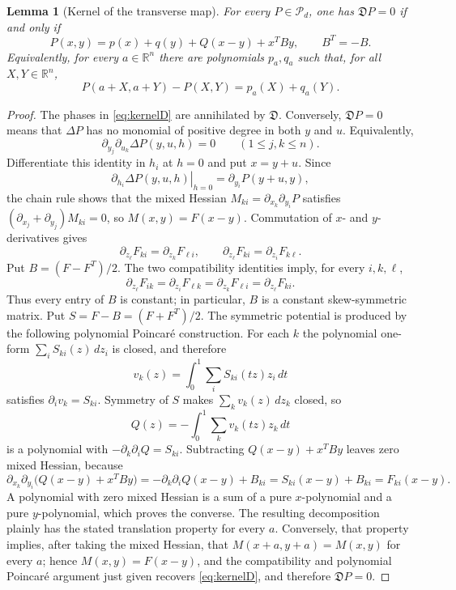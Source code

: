 \documentclass[11pt]{article}
\numberwithin{equation}{section}
\newtheorem{lemma}[theorem]{Lemma}
\theoremstyle{remark}
\theoremstyle{definition}
\newcommand{\R}{\mathbb R}
\newcommand{\Dop}{\mathfrak D}
\begin{document}
\begin{lemma}[Kernel of the transverse map]\label{lem:kernelD}
For every $P\in\mathcal P_d$, one has $\Dop P=0$ if and only if
\begin{equation}\label{eq:kernelD}
 P(x,y)=p(x)+q(y)+Q(x-y)+x^TBy,
 \qquad B^T=-B.
\end{equation}
Equivalently, for every $a\in\R^n$ there are polynomials $p_a,q_a$ such
that, for all $X,Y\in\R^n$,
\[
 P(a+X,a+Y)-P(X,Y)=p_a(X)+q_a(Y).
\]
\end{lemma}

\begin{proof}
The phases in \eqref{eq:kernelD} are annihilated by $\Dop$.  Conversely,
$\Dop P=0$ means that $\Delta P$ has no monomial of positive degree in
both $y$ and $u$.  Equivalently,
\[
 \partial_{y_j}\partial_{u_k}\Delta P(y,u,h)=0
 \qquad(1\le j,k\le n).
\]
Differentiate this identity in $h_i$ at $h=0$ and put $x=y+u$.
Since
\[
 \left.\partial_{h_i}\Delta P(y,u,h)\right|_{h=0}
 =\partial_{y_i}P(y+u,y),
\]
the chain rule shows that the mixed Hessian
$M_{ki}=\partial_{x_k}\partial_{y_i}P$ satisfies
$(\partial_{x_j}+\partial_{y_j})M_{ki}=0$, so $M(x,y)=F(x-y)$.
Commutation of $x$- and $y$-derivatives gives
\[
 \partial_{z_\ell}F_{ki}=\partial_{z_k}F_{\ell i},\qquad
 \partial_{z_\ell}F_{ki}=\partial_{z_i}F_{k\ell}.
\]
Put $B=(F-F^T)/2$.  The two compatibility identities imply, for every
$i,k,\ell$,
\[
 \partial_{z_\ell}F_{ik}
 =\partial_{z_i}F_{\ell k}
 =\partial_{z_k}F_{\ell i}
 =\partial_{z_\ell}F_{ki}.
\]
Thus every entry of $B$ is constant; in particular, $B$ is a constant
skew-symmetric matrix.  Put $S=F-B=(F+F^T)/2$.
The symmetric potential is produced by the following polynomial Poincar\'e
construction.  For each $k$ the polynomial one-form
$\sum_iS_{ki}(z)\,dz_i$ is closed, and therefore
\[
 v_k(z)=\int_0^1\sum_iS_{ki}(tz)z_i\,dt
\]
satisfies $\partial_i v_k=S_{ki}$.  Symmetry of $S$ makes
$\sum_kv_k(z)\,dz_k$ closed, so
\[
 Q(z)=-\int_0^1\sum_kv_k(tz)z_k\,dt
\]
is a polynomial with $-\partial_k\partial_iQ=S_{ki}$.  Subtracting
$Q(x-y)+x^TBy$ leaves zero mixed Hessian, because
\[
 \partial_{x_k}\partial_{y_i}
 \bigl(Q(x-y)+x^TBy\bigr)
 =-\partial_k\partial_iQ(x-y)+B_{ki}
 =S_{ki}(x-y)+B_{ki}=F_{ki}(x-y).
\]
A polynomial with zero mixed Hessian is a sum of a pure $x$-polynomial
and a pure $y$-polynomial, which proves the converse.  The resulting
decomposition plainly has the stated translation property for every $a$.
Conversely, that property implies, after taking the mixed Hessian, that
$M(x+a,y+a)=M(x,y)$ for every $a$; hence $M(x,y)=F(x-y)$, and the
compatibility and polynomial Poincar\'e argument just given recovers
\eqref{eq:kernelD}, and therefore $\Dop P=0$.
\end{proof}
\end{document}
